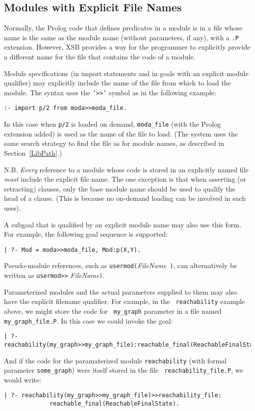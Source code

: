 
\subsection{Modules with Explicit File Names}

Normally, the Prolog code that defines predicates in a module is in a
file whose name is the same as the module name (without parameters, if
any), with a {\tt .P} extension.  However, XSB provides a way for the
programmer to explicitly provide a different name for the file that
contains the code of a module.

Module specifications (in import statements and in goals with an
explicit module qualifier) may explicitly include the name of the file
from which to load the module.  The syntax uses the {\tt '>>'} symbol as
in the following example:
\begin{verbatim}
:- import p/2 from moda>>moda_file.
\end{verbatim}
In this case when {\tt p/2} is loaded on demand, {\tt moda\_file}
(with the Prolog extension added) is used as the name of the
file to load.  (The system uses the same search strategy to find the
file as for module names, as described in Section~\ref{LibPath}.)

N.B. {\em Every} reference to a module whose code is stored in an
explicitly named file {\em must} include the explicit file name.  The
one exception is that when asserting (or retracting) clauses, only the
base module name should be used to qualify the head of a clause.
(This is because no on-demand loading can be involved in such uses).

A subgoal that is qualified by an explicit module name may also use
this form.  For example, the following goal sequence is supported:
\begin{verbatim}
| ?- Mod = moda>>moda_file, Mod:p(X,Y).
\end{verbatim}

Pseudo-module references, such as {\tt usermod(}{\em FileName}{\tt
  )}, can alternatively be written as {\tt usermod>>}{\em
  FileName}{\tt )}.

Parameterized modules and the actual parameters supplied to them may
also have the explicit filename qualifier.  For example, in the {\tt
  reachability} example above, we might store the code for {\tt
  my\_graph} parameter in a file named {\tt my\_graph\_file.P}.  In
this case we could invoke the goal:
\begin{verbatim}
| ?- reachability(my_graph>>my_graph_file):reachable_final(ReachableFinalState).
\end{verbatim}
And if the code for the paramaterized module {\tt reachability} (with
formal parameter {\tt some\_graph}) were itself stored in the file {\tt
  reachability\_file.P}, we would write:
\begin{verbatim}
| ?- reachability(my_graph>>my_graph_file)>>reachability_file:
             reachable_final(ReachableFinalState).
\end{verbatim}

